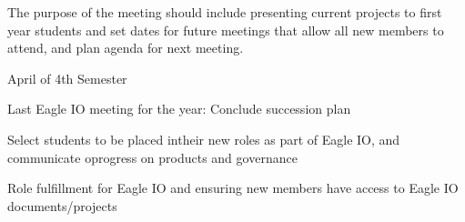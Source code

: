 \documentclass[
]{book}
\begin{document}
The purpose of the meeting should include presenting current projects to first year students and set dates for future meetings that allow all new members to attend, and plan agenda for next meeting.

April of 4th Semester

Last Eagle IO meeting for the year: Conclude succession plan

Select students to be placed intheir new roles as part of Eagle IO, and communicate oprogress on products and governance

Role fulfillment for Eagle IO and ensuring new members have access to Eagle IO documents/projects

  
\end{document}
